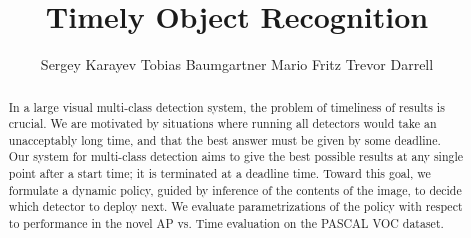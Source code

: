 \documentclass{article} %
\title{Timely Object Recognition}
\author{
Sergey Karayev \And
Tobias Baumgartner \And
Mario Fritz \And
Trevor Darrell
}
\begin{document}
\maketitle

\begin{abstract}
In a large visual multi-class detection system, the problem of timeliness of results is crucial.
We are motivated by situations where running all detectors would take an unacceptably long time, and that the best answer must be given by some deadline.
Our system for multi-class detection aims to give the best possible results at any single point after a start time; it is terminated at a deadline time.
Toward this goal, we formulate a dynamic policy, guided by inference of the contents of the image, to decide which detector to deploy next.
We evaluate parametrizations of the policy with respect to performance in the novel AP vs. Time evaluation on the PASCAL VOC dataset.
\end{abstract}






\renewcommand\bibsection{\subsubsection*{\refname}}

\small{
  
}
\end{document}
